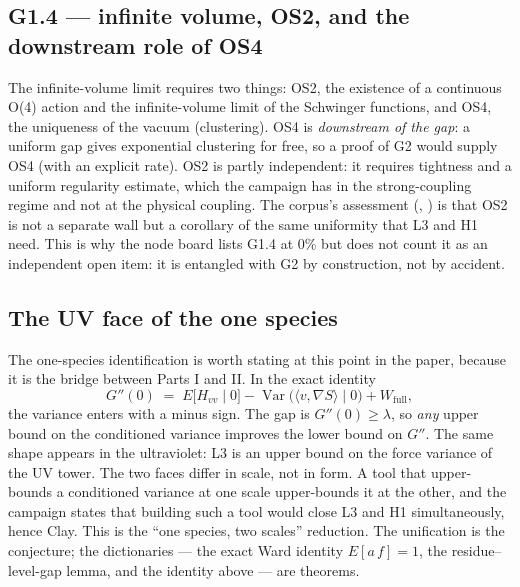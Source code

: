 \subsection{G1.4 --- infinite volume, OS2, and the downstream role of OS4}
\label{sec:g14}

The infinite-volume limit requires two things: OS2, the existence of a continuous O(4) action
and the infinite-volume limit of the Schwinger functions, and OS4, the uniqueness of the vacuum
(clustering). OS4 is \emph{downstream of the gap}: a uniform gap gives exponential clustering
for free, so a proof of G2 would supply OS4 (with an explicit rate). OS2 is partly independent:
it requires tightness and a uniform regularity estimate, which the campaign has in the
strong-coupling regime and not at the physical coupling. The corpus's assessment
(, ) is that OS2 is not a separate wall
but a corollary of the same uniformity that L3 and H1 need. This is why the node board lists
G1.4 at 0\% but does not count it as an independent open item: it is entangled with G2 by
construction, not by accident.

\subsection{The UV face of the one species}
\label{sec:uv-face}

The one-species identification is worth stating at this point in the paper, because it is the
bridge between Parts I and II. In the exact identity
\begin{equation}
G''(0)\;=\;E\bigl[H_{vv}\mid0\bigr]-\operatorname{Var}\bigl(\langle v,\nabla S\rangle\mid0\bigr)
+W_{\mathrm{full}},
\label{eq:species-identity}
\end{equation}
the variance enters with a minus sign. The gap is $G''(0)\ge\lambda$, so \emph{any} upper bound
on the conditioned variance improves the lower bound on $G''$. The same shape appears in the
ultraviolet: L3 is an upper bound on the force variance of the UV tower. The two faces differ in
scale, not in form. A tool that upper-bounds a conditioned variance at one scale upper-bounds it
at the other, and the campaign states that building such a tool would close L3 and H1
simultaneously, hence Clay. This is the ``one species, two scales'' reduction. The unification is
the conjecture; the dictionaries --- the exact Ward identity $E[a\,f]=1$, the residue--level-gap
lemma, and the identity above --- are theorems.

